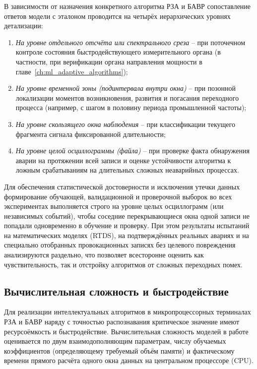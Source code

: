 В зависимости от назначения конкретного алгоритма РЗА и БАВР сопоставление
ответов модели с эталоном проводится на четырёх иерархических уровнях
детализации:
\begin{enumerate}
    \item \textit{На уровне отдельного отсчёта или спектрального среза} --
    при поточечном контроле состояния быстродействующего измерительного
    органа (в частности, при верификации органа направления мощности
    в главе~\ref{ch:ml_adaptive_algorithms});
    \item \textit{На уровне временной зоны (подинтервала внутри окна)} --
    при позонной локализации моментов возникновения, развития и погасания
    переходного процесса (например, с шагом в половину периода промышленной
    частоты);
    \item \textit{На уровне скользящего окна наблюдения} -- при классификации
    текущего фрагмента сигнала фиксированной длительности;
    \item \textit{На уровне целой осциллограммы (файла)} -- при проверке
    факта обнаружения аварии на протяжении всей записи и оценке устойчивости
    алгоритма к ложным срабатываниям на длительных сложных неаварийных
    процессах.
\end{enumerate}

Для обеспечения статистической достоверности и исключения утечки данных
формирование обучающей, валидационной и проверочной выборок во всех
экспериментах выполняется строго на уровне целых осциллограмм (или
независимых событий), чтобы соседние перекрывающиеся окна одной записи
не попадали одновременно в обучение и проверку. При этом результаты
испытаний на математических моделях (RTDS), на подтверждённых реальных
авариях и на специально отобранных провокационных записях без целевого
повреждения анализируются раздельно, что позволяет всесторонне оценить
как чувствительность, так и отстройку алгоритмов от сложных переходных помех.

\subsection{Вычислительная сложность и быстродействие}
\label{sec:ch4_metric_runtime}


Для реализации интеллектуальных алгоритмов в микропроцессорных терминалах
РЗА и БАВР наряду с точностью распознавания критическое значение имеют
ресурсоёмкость и быстродействие. Вычислительная сложность моделей в работе
оценивается по двум взаимодополняющим параметрам, числу обучаемых
коэффициентов (определяющему требуемый объём памяти) и фактическому
времени прямого расчёта одного окна данных на центральном процессоре (CPU).

